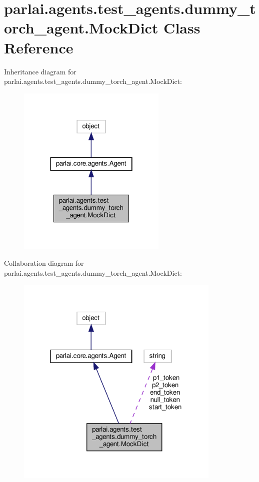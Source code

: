 \hypertarget{classparlai_1_1agents_1_1test__agents_1_1dummy__torch__agent_1_1MockDict}{}\section{parlai.\+agents.\+test\+\_\+agents.\+dummy\+\_\+torch\+\_\+agent.\+Mock\+Dict Class Reference}
\label{classparlai_1_1agents_1_1test__agents_1_1dummy__torch__agent_1_1MockDict}


Inheritance diagram for parlai.\+agents.\+test\+\_\+agents.\+dummy\+\_\+torch\+\_\+agent.\+Mock\+Dict\+:
\nopagebreak
\begin{figure}[H]
\begin{center}
\leavevmode
\includegraphics[width=202pt]{de/db6/classparlai_1_1agents_1_1test__agents_1_1dummy__torch__agent_1_1MockDict__inherit__graph}
\end{center}
\end{figure}


Collaboration diagram for parlai.\+agents.\+test\+\_\+agents.\+dummy\+\_\+torch\+\_\+agent.\+Mock\+Dict\+:
\nopagebreak
\begin{figure}[H]
\begin{center}
\leavevmode
\includegraphics[width=277pt]{d1/d32/classparlai_1_1agents_1_1test__agents_1_1dummy__torch__agent_1_1MockDict__coll__graph}
\end{center}
\end{figure}
